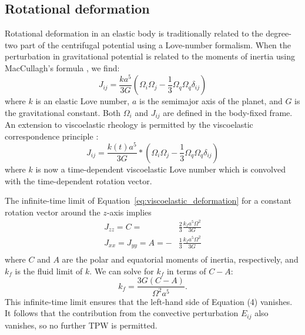 \documentclass[preprint,12pt,authoryear]{elsarticle}
\begin{document}
\subsection{Rotational deformation}
\label{sec:rotational_deformation}

Rotational deformation in an elastic body is traditionally related to the degree-two part of the 
centrifugal potential using a Love-number formalism. When the perturbation in gravitational
potential is related to the moments of inertia using MacCullagh's formula  \citep{munk1960rotation}, we find:
\begin{equation}
J_{ij} = \frac{k a^5}{3 G} \left( \Omega_i \Omega_j - \frac{1}{3} \Omega_q \Omega_q \delta_{ij} \right)
\label{eq:elastic_deformation}
\end{equation}
where $k$ is an elastic Love number, $a$ is the semimajor axis of the planet, and $G$ is the gravitational constant. Both $\Omega_i$ and
$J_{ij}$ are defined in the body-fixed frame. An extension to  viscoelastic rheology is permitted by the viscoelastic correspondence principle \citep[e.g.][]{peltier1974impulse}:
\begin{equation}
J_{ij} = \frac{k(t) a^5}{3 G} * \left( \Omega_i \Omega_j - \frac{1}{3} \Omega_q \Omega_q \delta_{ij} \right)
\label{eq:viscoelastic_deformation}
\end{equation}
where $k$ is now a time-dependent viscoelastic Love number which is convolved with the time-dependent rotation vector.

The infinite-time limit of Equation~\eqref{eq:viscoelastic_deformation} for a 
constant rotation vector around the $z$-axis implies
\begin{equation}
\begin{aligned}
J_{zz} = C = &\frac{2}{3} \frac{k_f a^5 \Omega^2}{3 G} \\
J_{xx} = J_{yy} = A = -&\frac{1}{3} \frac{k_f a^5 \Omega^2}{3 G} \\
\end{aligned}
\end{equation}
where $C$ and $A$ are the polar and equatorial moments of inertia, respectively, 
and $k_f$ is the fluid limit of $k$. 
We can solve for $k_f$ in terms of $C-A$:
\begin{equation}
k_f = \frac{3 G (C-A)}{\Omega^2 a^5}.
\label{eq:fluid_love}
\end{equation}
This infinite-time limit  ensures that the left-hand side of Equation (4) vanishes. It follows that the contribution from the convective perturbation $E_{ij}$ also vanishes, so no further TPW is permitted.
\end{document}
